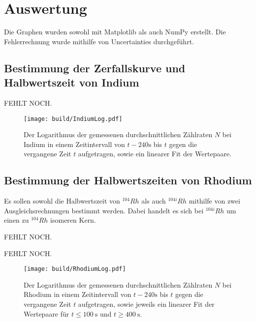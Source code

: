 \section{Auswertung}
\label{sec:Auswertung}


Die Graphen wurden sowohl mit Matplotlib \cite{matplotlib} als auch NumPy \cite{numpy} erstellt. Die
Fehlerrechnung wurde mithilfe von Uncertainties \cite{uncertainties} durchgeführt.


\subsection{Bestimmung der Zerfallskurve und Halbwertszeit von Indium}
 \begin{table}
  \centering
  \caption{FEHLT NOCH.}
  
 \end{table}
\begin{figure}
	\centering
	\caption{Der Logarithmus der gemessenen durchschnittlichen Zählraten $N$ bei Indium in einem Zeitintervall von $t-240\si{\second}$ bis $t$ gegen die vergangene Zeit $t$ aufgetragen, sowie ein linearer Fit der Wertepaare.}
	\texttt{[image: build/IndiumLog.pdf]}
	\label{fig:Indium}
\end{figure}

\subsection{Bestimmung der Halbwertszeiten von Rhodium}
Es sollen sowohl die Halbwertszeit von $^{104} Rh$ als auch $^{104i} Rh$ mithilfe von zwei Ausgleichsrechnungen bestimmt werden. Dabei handelt es sich bei $^{104i} Rh$ um einen zu $^{104} Rh$ isomeren Kern.
 \begin{table}
	\centering
	\caption{FEHLT NOCH.}
	
\end{table}
\begin{table}
	\centering
	\caption{FEHLT NOCH.}
	
\end{table}
\begin{figure}
	\centering
	\caption{Der Logarithmus der gemessenen durchschnittlichen Zählraten $N$ bei Rhodium in einem Zeitintervall von $t-240\si{\second}$ bis $t$ gegen die vergangene Zeit $t$ aufgetragen, sowie jeweils ein linearer Fit der Wertepaare für $t\le \SI{100}{\second}$ und  $t\ge \SI{400}{\second}$.}
	\texttt{[image: build/RhodiumLog.pdf]}
	\label{fig:Rhodium}
\end{figure}



